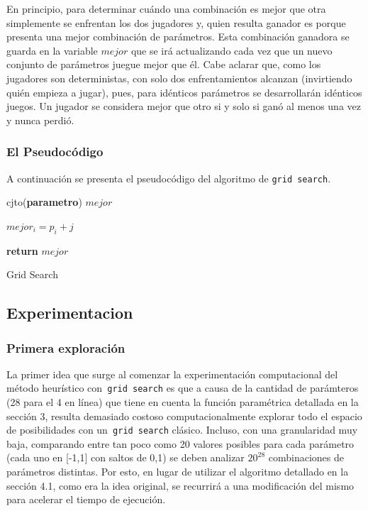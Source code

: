 \documentclass[A4paper,oneside,fleqn,11pt]{article}
\theoremstyle{definition}
\begin{document}
En principio, para determinar cuándo una combinación es mejor que otra simplemente se enfrentan los dos jugadores y, quien resulta ganador es porque presenta una mejor combinación de parámetros. Esta combinación ganadora se guarda en la variable $mejor$ que se irá actualizando cada vez que un nuevo conjunto de parámetros juegue mejor que él. Cabe aclarar que, como los jugadores son deterministas, con solo dos enfrentamientos alcanzan (invirtiendo quién empieza a jugar), pues, para idénticos parámetros se desarrollarán idénticos juegos. Un jugador se considera mejor que otro si y solo si ganó al menos una vez y nunca perdió.
 
\subsubsection{El Pseudocódigo}

A continuación se presenta el pseudocódigo del algoritmo de \texttt{grid search}.

\begin{algorithm}



cjto(\textbf{parametro}) $mejor$

	{
		{	
			{		
			$mejor_i = p_i +j$		
			}
		}
	}

\textbf{return} $mejor$

\caption{Grid Search}
\end{algorithm}

\subsection{Experimentacion}

\subsubsection{Primera exploración}

La primer idea que surge al comenzar la experimentación computacional del método heurístico con\texttt{ grid search} es que a causa de la cantidad de parámteros (28 para el 4 en línea) que tiene en cuenta la función paramétrica detallada en la sección 3, resulta demasiado costoso computacionalmente explorar todo el espacio de posibilidades con un\texttt{ grid search} clásico. Incluso, con una granularidad muy baja, comparando entre tan poco como 20 valores posibles para cada parámetro (cada uno en [-1,1] con saltos de 0,1) se deben analizar $ 20^{28}$ combinaciones de parámetros distintas. Por esto, en lugar de utilizar el algoritmo detallado en la sección 4.1, como era la idea original, se recurrirá a una modificación del mismo para acelerar el tiempo de ejecución.
\end{document}
